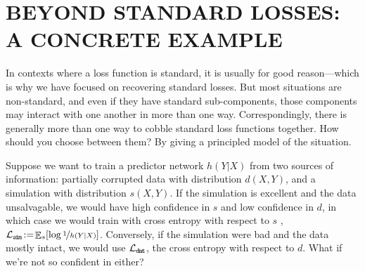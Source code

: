 \documentclass[twoside]{article}
\theoremstyle{plain}
\theoremstyle{definition}
\DeclareMathOperator*{\Ex}{\mathbb{E}} %
\begin{document}
\section{BEYOND STANDARD LOSSES: A CONCRETE EXAMPLE}
	\label{sec:datsim}
%
In contexts where a loss function is standard, it is usually for good reason---which is why we have focused on recovering standard losses.
But most situations are non-standard, and even if they have standard sub-components, those components may interact with one another in more than one way.
Correspondingly, there is generally more than one way to cobble standard loss functions together.
How should you choose between them?
By giving a principled model of the situation.

\def\simsymb{\texttt{s\kern-1.1pti\kern-0.8ptm}}
\def\datsymb{\texttt{d\kern-0.75pta\kern-1ptt}}
\def\ssymb{\texttt{s}}
\def\dsymb{\texttt{d}}
Suppose we want to train a predictor network $h(Y|X)$ from two sources of information:
partially corrupted data with distribution $d(X,Y)$,
and a simulation with distribution $s(X,Y)$.
If the simulation is excellent and the data unsalvagable, we would have high confidence in $s$ and low confidence in $d$,
in which case we would train with cross entropy with respect to $s$%
, $\mathcal L_{\simsymb}\!:=\!\Ex_s [\log \nf1{h(Y|X)}]$.
Conversely, if the simulation were bad and the data mostly intact, we would use
$\mathcal L_\datsymb$,
the cross entropy with respect to $d$.
What if we're not so confident in either?
\end{document}
